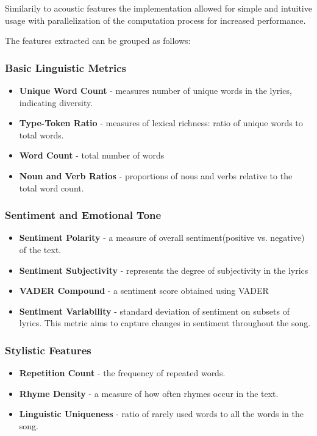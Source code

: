 Similarily to acoustic features the implementation allowed for simple and
intuitive usage  with parallelization of the computation process for increased
performance. 

The features extracted can be grouped as follows:

\subsubsection*{Basic Linguistic Metrics}
\begin{itemize}
  \item \textbf{Unique Word Count} - measures number of unique words in the
    lyrics, indicating diversity.
  \item \textbf{Type-Token Ratio} - measures of lexical richness: ratio of
    unique words to total words.
  \item \textbf{Word Count} - total  number of words
  \item \textbf{Noun and Verb Ratios} - proportions of nous and verbs relative
    to the total word count.
\end{itemize}


\subsubsection*{Sentiment and Emotional Tone}
\begin{itemize}
  \item \textbf{Sentiment Polarity} - a measure of overall sentiment(positive
    vs. negative) of the text.
  \item \textbf{Sentiment Subjectivity} - represents the degree of subjectivity
    in the lyrics
  \item \textbf{VADER Compound} - a sentiment score obtained using VADER
  \item \textbf{Sentiment Variability} - standard deviation of sentiment on
    subsets of lyrics. This metric aims to capture changes in sentiment
    throughout the song.
\end{itemize}


\subsubsection*{Stylistic Features}
\begin{itemize}
  \item \textbf{Repetition Count} - the frequency of repeated words.
  \item \textbf{Rhyme Density} - a measure of how often rhymes occur in the
    text.
  \item \textbf{Linguistic Uniqueness} - ratio of rarely used words to all the
    words in the song.
\end{itemize}



